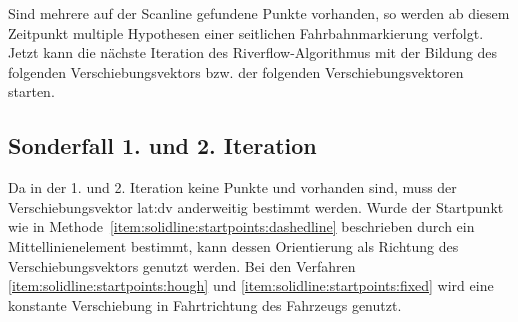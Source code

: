 
Sind mehrere auf der Scanline  gefundene Punkte   vorhanden, so werden ab diesem Zeitpunkt multiple Hypothesen einer seitlichen Fahrbahnmarkierung verfolgt.
Jetzt kann die nächste Iteration des Riverflow-Algorithmus mit der Bildung des folgenden Verschiebungsvektors bzw. der folgenden Verschiebungsvektoren  starten.

\subsection{Sonderfall 1. und 2. Iteration}
Da in der 1. und 2. Iteration keine Punkte  und  vorhanden sind, muss der Verschiebungsvektor \gls{lat:dv} anderweitig bestimmt werden. 
Wurde der Startpunkt wie in Methode~\ref{item:solidline:startpoints:dashedline} beschrieben durch ein Mittellinienelement bestimmt, kann dessen Orientierung als Richtung des Verschiebungsvektors genutzt werden.
Bei den Verfahren \ref{item:solidline:startpoints:hough} und \ref{item:solidline:startpoints:fixed} wird eine konstante Verschiebung in Fahrtrichtung des Fahrzeugs genutzt.

